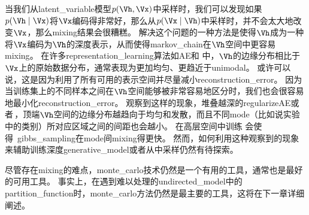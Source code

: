 当我们从\gls{latent_variable}模型$p(\Vh,\Vx)$中采样时，我们可以发现如果$p(\Vh\mid \Vx)$将$\Vx$编码得非常好，那么从$p(\Vx \mid \Vh)$中采样时，并不会太大地改变$\Vx$，那么\gls{mixing}结果会很糟糕。
解决这个问题的一种方法是使得$\Vh$成为一种将$\Vx$编码为$\Vh$的深度表示，从而使得\gls{markov_chain}在$\Vh$空间中更容易\gls{mixing}。
在许多\gls{representation_learning}算法如\gls{AE}和\,\,中，$\Vh$的边缘分布相比于$\Vx$上的原始数据分布，通常表现为更加均匀、更趋近于\gls{unimodal}。
或许可以说，这是因为利用了所有可用的表示空间并尽量减小\gls{reconstruction_error}。
因为当训练集上的不同样本之间在$\Vh$空间能够被非常容易地区分时，我们也会很容易地最小化\gls{reconstruction_error}。
\citet{Bengio-et-al-2013a}观察到这样的现象，堆叠越深的\gls{regularize}\gls{AE}或者\,，顶端$\Vh$空间的边缘分布越趋向于均匀和发散，而且不同\gls{mode}（比如说实验中的类别）所对应区域之间的间距也会越小。
在高层空间中训练\,\,会使得~\gls{gibbs_sampling}在\gls{mode}间\gls{mixing}得更快。
然而，如何利用这种观察到的现象来辅助训练深度\gls{generative_model}或者从中采样仍然有待探索。

尽管存在\gls{mixing}的难点，\gls{monte_carlo}技术仍然是一个有用的工具，通常也是最好的可用工具。  
事实上，在遇到难以处理的\gls{undirected_model}中的\gls{partition_function}时，\gls{monte_carlo}方法仍然是最主要的工具，这将在下一章详细阐述。
